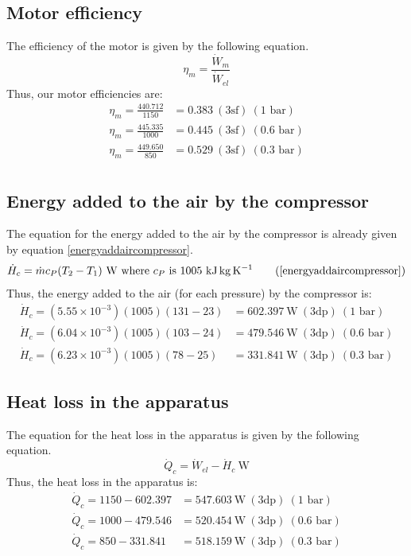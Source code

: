 \documentclass[class=article, crop=false, 12pt,a4paper]{standalone}
\numberwithin{equation}{section}
\begin{document}
\subsection{Motor efficiency}
The efficiency of the motor is given by the following equation.
\begin{equation}
  \eta_m = \frac{\dot{W}_m}{\dot{W}_{el}}
\end{equation}
Thus, our motor efficiencies are:
\begin{align}
  \eta_m = \frac{440.712}{1150} &= 0.383 \ (3\textrm{sf}) \ (1 \textrm{ bar})\\
  \eta_m = \frac{445.335}{1000} &= 0.445 \ (3\textrm{sf}) \ (0.6 \textrm{ bar})\\
  \eta_m = \frac{449.650}{850} &= 0.529 \ (3\textrm{sf}) \ (0.3 \textrm{ bar})\\
\end{align}
\subsection{Energy added to the air by the compressor}
The equation for the energy added to the air by the compressor is already given by equation \ref{energyaddaircompressor}.
\begin{equation}
  \dot{H}_c = \dot{m}c_P(T_2-T_1) \ \si{\watt} \textrm{ where \(c_P\) is 1005 \si{\kilo\joule\kg\per\kelvin}}
  \tag{\ref{energyaddaircompressor}}
\end{equation}
Thus, the energy added to the air (for each pressure) by the compressor is:
\begin{align}
  \dot{H}_c = (5.55\times 10^{-3})(1005)(131-23) &=602.397 \ \si{\watt} \ (3\textrm{dp}) \ (1 \textrm{ bar})\\
  \dot{H}_c = (6.04\times 10^{-3})(1005)(103-24) &=479.546 \ \si{\watt} \ (3\textrm{dp}) \ (0.6 \textrm{ bar})\\
  \dot{H}_c = (6.23\times 10^{-3})(1005)(78-25) &=331.841 \ \si{\watt} \ (3\textrm{dp}) \ (0.3 \textrm{ bar})
\end{align}
\subsection{Heat loss in the apparatus}
The equation for the heat loss in the apparatus is given by the following equation.
\begin{equation}
  \dot{Q}_c = \dot{W}_{el} - \dot{H}_c \ \si{\watt}
\end{equation}
Thus, the heat loss in the apparatus is:
\begin{align}
  \dot{Q}_c = 1150 - 602.397 &=547.603 \ \si{\watt} \ (3\textrm{dp}) \ (1 \textrm{ bar})\\
  \dot{Q}_c = 1000 - 479.546 &=520.454 \ \si{\watt} \ (3\textrm{dp}) \ (0.6 \textrm{ bar})\\
  \dot{Q}_c = 850 - 331.841 &=518.159 \ \si{\watt} \ (3\textrm{dp}) \ (0.3 \textrm{ bar})
\end{align}
\end{document}
